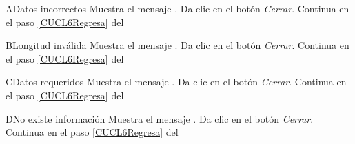 
\begin{UCtrayectoriaA}{A}{Datos incorrectos}
	\UCpaso Muestra el mensaje . 
	\UCpaso[\UCactor] Da clic en el botón \textit{Cerrar}.
	\UCpaso[\UCactor] Continua en el paso \ref{CUCL6Regresa} del 

\end{UCtrayectoriaA} 

\begin{UCtrayectoriaA}{B}{Longitud inválida}
	\UCpaso Muestra el mensaje . 
	\UCpaso[\UCactor] Da clic en el botón \textit{Cerrar}.
	\UCpaso[\UCactor] Continua en el paso \ref{CUCL6Regresa} del 

\end{UCtrayectoriaA}

\begin{UCtrayectoriaA}{C}{Datos requeridos}
	\UCpaso Muestra el mensaje . 
	\UCpaso[\UCactor] Da clic en el botón \textit{Cerrar}.
	\UCpaso[\UCactor] Continua en el paso \ref{CUCL6Regresa} del 

\end{UCtrayectoriaA}

\begin{UCtrayectoriaA}{D}{No existe información}
	\UCpaso Muestra el mensaje . 
	\UCpaso[\UCactor] Da clic en el botón \textit{Cerrar}.
	\UCpaso[\UCactor] Continua en el paso \ref{CUCL6Regresa} del 

\end{UCtrayectoriaA}

		
